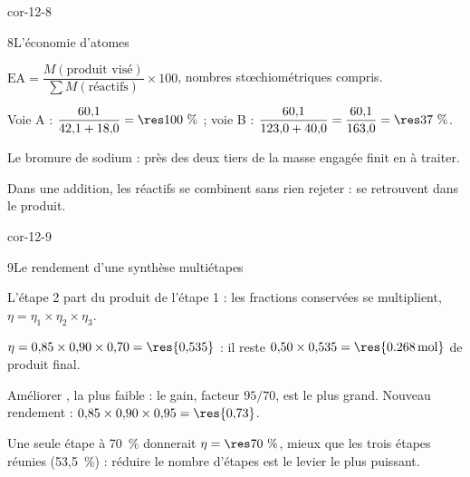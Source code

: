 \begin{blocLivre}{cor-12-8}
\begin{corrige}{8}{L'économie d'atomes}
\begin{questions}
\item $\mathrm{EA}=\dfrac{M(\text{produit visé})}{\sum M(\text{réactifs})}\times100$, nombres stœchiométriques
compris.
\item Voie A : $\dfrac{60{,}1}{42{,}1+18{,}0}=\res{100~\%}$ ; voie B :
$\dfrac{60{,}1}{123{,}0+40{,}0}=\dfrac{60{,}1}{163{,}0}=\res{37~\%}$.
\item Le bromure de sodium  : près des deux tiers de la masse engagée finit en  à
traiter.
\item Dans une addition, les réactifs se combinent sans rien rejeter :  se retrouvent
dans le produit.
\end{questions}
\end{corrige}
\end{blocLivre}
\begin{blocLivre}{cor-12-9}
\begin{corrige}{9}{Le rendement d'une synthèse multiétapes}
\begin{questions}
\item L'étape 2 part du produit de l'étape 1 : les fractions conservées se multiplient,
$\eta=\eta_1\times\eta_2\times\eta_3$.
\item $\eta=0{,}85\times0{,}90\times0{,}70=\res{0{,}535}$ : il reste
$0{,}50\times0{,}535=\res{\qty{0,268}{mol}}$ de produit final.
\item Améliorer , la plus faible : le gain, facteur $95/70$, est le plus grand. Nouveau
rendement : $0{,}85\times0{,}90\times0{,}95=\res{0{,}73}$.
\item Une seule étape à 70~\% donnerait $\eta=\res{70~\%}$, mieux que les trois étapes réunies (53,5~\%) : réduire le
nombre d'étapes est le levier le plus puissant.
\end{questions}
\end{corrige}
\end{blocLivre}
